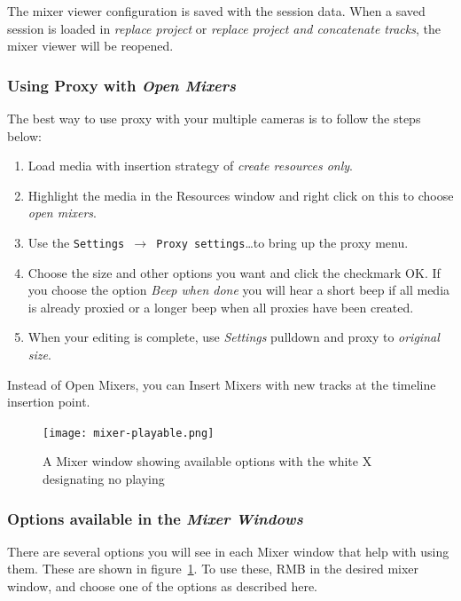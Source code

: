 The mixer viewer configuration is saved with the session data.  When a saved session is loaded in \textit{replace project} or \textit{replace project and concatenate tracks}, the mixer viewer will be reopened.

\subsubsection*{Using Proxy with \textit{Open Mixers}}%
\label{ssub:using_proxy_open_mixers}

The best way to use proxy with your multiple cameras is to follow the steps below:

\begin{enumerate}
	\item Load media with insertion strategy of \textit{create resources only}.
	\item Highlight the media in the Resources window and right click on this to choose \textit{open mixers}.
	\item Use the \texttt{Settings $\rightarrow$ Proxy settings}\dots to bring up the proxy menu.
	\item Choose the size and other options you want and click the checkmark OK. If you choose the option \textit{Beep when done} you will hear a short beep if all media is already proxied or a longer beep when all proxies have been created.
	\item When your editing is complete, use \textit{Settings} pulldown and proxy to \textit{original size}.
\end{enumerate}
Instead of Open Mixers, you can Insert Mixers with new tracks at the timeline insertion point.

\begin{figure}[htpb]
	\centering
	\texttt{[image: mixer-playable.png]}
	\caption{A Mixer window showing available options with the white X designating no playing}
	\label{fig:mixer-playable}
\end{figure}

\subsubsection*{Options available in the \textit{Mixer Windows}}%
\label{ssub:options_available_with_mixers}

There are several options you will see in each Mixer window that help with using them. These
are shown in figure~\ref{fig:mixer-playable}. To use these, RMB in the desired mixer window,
and choose one of the options as described here.

